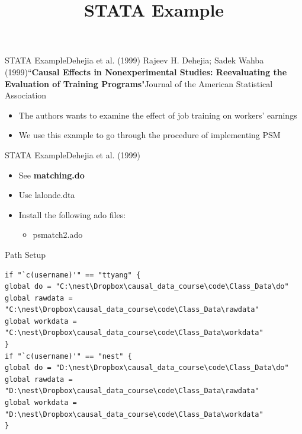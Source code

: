 \documentclass[dvipsnames,hyperref={pdfpagelabels=false}]{beamer}
\begin{document}
\title[]  
{STATA Example}

\author 
{}

\institute{}

\date
{}

\begin{frame}{}
	\titlepage
\end{frame}


\begin{frame}{STATA Example}{Dehejia et al. (1999)}	Rajeev H. Dehejia; Sadek Wahba (1999)``\textbf{Causal Effects in Nonexperimental Studies: Reevaluating the Evaluation of Training Programs}"Journal of the American Statistical Association 
	\begin{itemize}
		\vspace{0.2cm}
		\item The authors wants to examine the effect of job training on workers' earnings
		\vspace{0.2cm}
		\item We use this example to go through the procedure of implementing PSM
	\end{itemize}
\end{frame}


\begin{frame}{STATA Example}{Dehejia et al. (1999)}
	\begin{itemize}
		\item See \textbf{matching.do}
		\vspace{0.2cm}
		\item Use lalonde.dta
		\vspace{0.2cm}
		\item Install the following ado files:
		\begin{itemize}
			\vspace{0.2cm}
			\item psmatch2.ado 
		\end{itemize}
		
	\end{itemize}
\end{frame}


\begin{frame}[fragile]{Path Setup}{}
\begin{lstlisting}
if "`c(username)'" == "ttyang" {
global do = "C:\nest\Dropbox\causal_data_course\code\Class_Data\do"
global rawdata = "C:\nest\Dropbox\causal_data_course\code\Class_Data\rawdata"
global workdata = "C:\nest\Dropbox\causal_data_course\code\Class_Data\workdata"
}
if "`c(username)'" == "nest" {
global do = "D:\nest\Dropbox\causal_data_course\code\Class_Data\do"
global rawdata = "D:\nest\Dropbox\causal_data_course\code\Class_Data\rawdata"
global workdata = "D:\nest\Dropbox\causal_data_course\code\Class_Data\workdata"
}
\end{lstlisting}
\end{frame}
\end{document}
